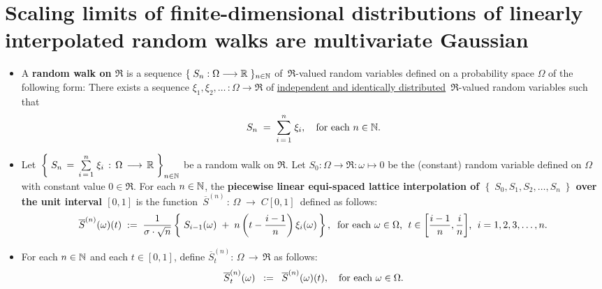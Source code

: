 

\section{Scaling limits of finite-dimensional distributions of linearly interpolated random walks are multivariate Gaussian}
\setcounter{theorem}{0}
\setcounter{equation}{0}

\renewcommand{\theenumi}{\roman{enumi}}
\renewcommand{\labelenumi}{\textnormal{(\theenumi)}$\;\;$}

\begin{definition}
\label{randomWalksOnR}
\mbox{}\vskip 0cm
\begin{itemize}
\item	A \textbf{random walk on $\Re$} is a sequence $\{\;S_{n} : \Omega \longrightarrow \mathbb{R}\;\}_{n\in\mathbb{N}}$
		of \,$\Re$-valued random variables defined on a probability space $\Omega$ of the following form:
		There exists a sequence $\xi_{1}, \xi_{2}, \ldots \, : \Omega \longrightarrow \Re$ of
		\underline{independent and identically distributed} \,$\Re$-valued random variables such that
		\begin{equation*}
		S_{n} \; = \; \overset{n}{\underset{i\,=\,1}{\sum}}\;\xi_{i},
		\quad
		\textnormal{for each $n \in \mathbb{N}$}.
		\end{equation*}
\item	Let
		\,$\left\{\;S_{n} \,=\, \overset{n}{\underset{i\,=\,1}{\sum}}\;\xi_{i} \,:\, \Omega \,\longrightarrow\, \mathbb{R}\;\right\}_{n\in\mathbb{N}}$
		be a random walk on $\Re$.
		Let $S_{0} : \Omega \longrightarrow \Re : \omega \longmapsto 0$ be the (constant) random variable
		defined on $\Omega$ with constant value $0 \in \Re$. 
		\vskip 0.1cm
		For each $n \in \mathbb{N}$, the \textbf{piecewise linear equi-spaced lattice interpolation
		of $\left\{\;S_{0},S_{1},S_{2},\ldots,S_{n}\;\right\}$ over the unit interval $[0,1]$}
		is the function
		\,$\overline{S}^{(n)} \,:\, \Omega \;\longrightarrow\;C[0,1]$\,
		defined as follows:
		\begin{equation*}
		\overline{S}^{(n)}(\omega)(t)
		\; := \;
		\dfrac{1}{\sigma\cdot\sqrt{n}}
		\left\{\;
		S_{i-1}(\omega) \;+\; n\left(t - \dfrac{i-1}{n}\right)\xi_{i}(\omega)
		\,\right\},
		\;\;
		\textnormal{for each $\omega \in \Omega$, \;$t \in \left[\frac{i-1}{n},\frac{i}{n}\right]$, \;$i = 1,2,3,\ldots,n$}.
		\end{equation*}
\item	For each $n \in \mathbb{N}$ and each $t \in [0,1]$, define
		\;$\overline{S}^{(n)}_{t} : \,\Omega \, \longrightarrow \, \Re$\;
		as follows:
		\begin{equation*}
		\overline{S}^{(n)}_{t}(\omega) \;\; := \;\; \overline{S}^{(n)}(\omega)(t),
		\quad
		\textnormal{for each $\omega \in \Omega$}.
		\end{equation*}
\end{itemize}
\end{definition}

